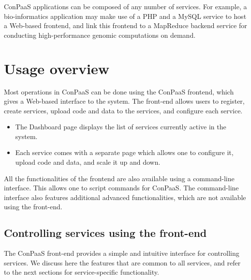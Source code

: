 \documentclass[10pt]{article}
\begin{document}
ConPaaS applications can be composed of any number of services. For
example, a bio-informatics application may make use of a PHP and a
MySQL service to host a Web-based frontend, and link this frontend to
a MapReduce backend service for conducting high-performance genomic
computations on demand.

\section{Usage overview}

Most operations in ConPaaS can be done using the ConPaaS frontend,
which gives a Web-based interface to the system. The front-end allows
users to register, create services, upload code and data to the
services, and configure each service. 

\begin{itemize}
\item The Dashboard page displays the list of services currently
  active in the system. 
\item Each service comes with a separate page which allows one to
  configure it, upload code and data, and scale it up and down.
\end{itemize}

All the functionalities of the frontend are also available using a
command-line interface. This allows one to script commands for
ConPaaS. The command-line interface also features additional advanced
functionalities, which are not available using the front-end.

\subsection{Controlling services using the front-end}

The ConPaaS front-end provides a simple and intuitive interface for
controlling services. We discuss here the features that are common to
all services, and refer to the next sections for service-specific
functionality.
\end{document}
